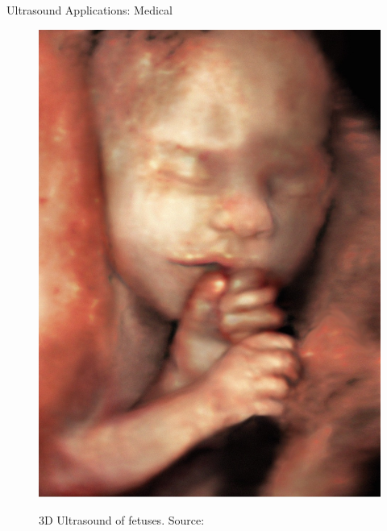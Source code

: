 \begin{frame}{Ultrasound Applications: Medical \cont}
    \begin{figure}
        \centering
        \includegraphics[height=0.8\textheight]{images/SH_US_34572_12.jpg}\\
        \caption{3D Ultrasound of fetuses. Source:~\cite{neumann18}}
    \end{figure}
\end{frame}



